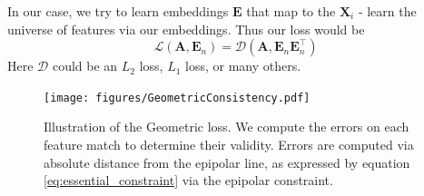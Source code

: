 \documentclass[10pt,twocolumn,letterpaper]{article}
\newcommand{\mat}[1]{\mathbf{#1}}
\begin{document}
In our case, we try to learn embeddings $\mat{E}$ that map to the $\mat{X}_i$ - learn the universe of features via our embeddings.
Thus our loss would be 
\begin{equation}
\mathcal{L}(\mat{A}, \mat{E}_n) = \mathcal{D}(\mat{A}, \mat{E}_n\mat{E}_n^\top)
\end{equation}
Here $\mathcal{D}$ could be an $L_2$ loss, $L_1$ loss, or many others. 

\begin{figure}[t]
\begin{center}
  \texttt{[image: figures/GeometricConsistency.pdf]}
\end{center}
  \caption{
    Illustration of the Geometric loss.
    We compute the errors on each feature match to determine their validity.
    Errors are computed via absolute distance from the epipolar line, as expressed by equation \ref{eq:essential_constraint} via the epipolar constraint.
  }
\label{fig:cycconsistex}
\label{fig:onecol}
\end{figure}
\end{document}
